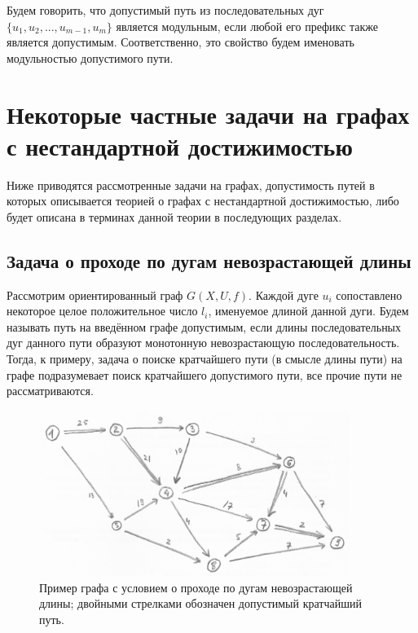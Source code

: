 \begin{definition}
	Будем говорить, что допустимый путь из последовательных дуг $\{u_1, u_2, ... , u_{m-1}, u_m\}$ является модульным, если любой его префикс также является допустимым. Соответственно, это свойство будем именовать модульностью допустимого пути. 
\end{definition}

\section{Некоторые частные задачи на графах с нестандартной достижимостью}

Ниже приводятся рассмотренные задачи на графах, допустимость путей в которых описывается теорией о графах с нестандартной достижимостью, либо будет описана в терминах данной теории в последующих разделах. 

\subsection{Задача о проходе по дугам невозрастающей длины}

Рассмотрим ориентированный граф $G(X,U,f)$. Каждой дуге $u_i$ сопоставлено некоторое целое положительное число $l_i$, именуемое длиной данной дуги. Будем называть путь на введённом графе допустимым, если длины последовательных дуг данного пути образуют монотонную невозрастающую последовательность. Тогда, к примеру, задача о поиске кратчайшего пути (в смысле длины пути) на графе подразумевает поиск кратчайшего допустимого пути, все прочие пути не рассматриваются. 

\begin{figure}
	\centering	
	{\includegraphics[width=0.9\textwidth]{img/1.png}}
	{Пример графа с условием о проходе по дугам невозрастающей длины; двойными стрелками обозначен допустимый кратчайший путь.}
	\label{fig:pic_1}
\end{figure}

